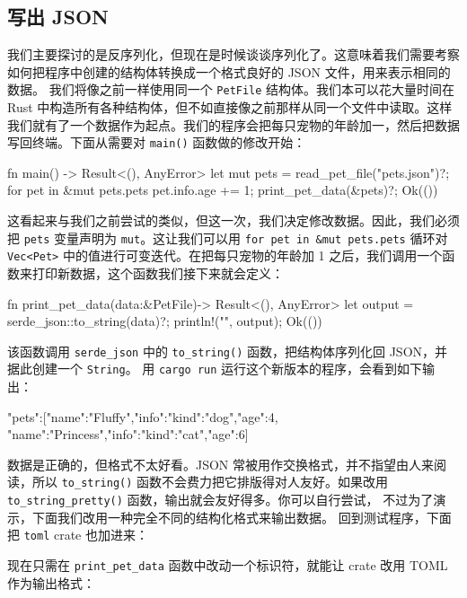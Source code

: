 \subsection{写出 JSON}
\label{idx:idx_d23393ce}
我们主要探讨的是反序列化，但现在是时候谈谈序列化了。这意味着我们需要考察如何把程序中创建的结构体转换成一个格式良好的 JSON 文件，用来表示相同的数据。
我们将像之前一样使用同一个 \texttt{PetFile} 结构体。我们本可以花大量时间在 Rust 中构造所有各种结构体，但不如直接像之前那样从同一个文件中读取。这样我们就有了一个数据作为起点。我们的程序会把每只宠物的年龄加一，然后把数据写回终端。下面从需要对 \texttt{main()} 函数做的修改开始：
\begin{codebox}[rust]
fn main() -> Result<(), AnyError> {
    let mut pets = read_pet_file("pets.json")?;
    for pet in &mut pets.pets {
        pet.info.age += 1;
    }
    print_pet_data(&pets)?;
    Ok(())
}
\end{codebox}
\label{idx:idx_812a2668}
这看起来与我们之前尝试的类似，但这一次，我们决定修改数据。因此，我们必须把 \texttt{pets} 变量声明为 \texttt{mut}。这让我们可以用 \texttt{for pet in \&\allowbreak{}mut pets.\allowbreak{}pets} 循环对 \texttt{Vec<Pet>} 中的值进行可变迭代。在把每只宠物的年龄加 1 之后，我们调用一个函数来打印新数据，这个函数我们接下来就会定义：
\begin{codebox}[rust]
fn print_pet_data(data:&PetFile)-> Result<(), AnyError> {
    let output = serde_json::to_string(data)?;
    println!("{}", output);
    Ok(())
}
\end{codebox}
该函数调用 \texttt{serde\_json} 中的 \texttt{to\_\allowbreak{}string(\allowbreak{})\allowbreak{}} 函数，把结构体序列化回 JSON，并据此创建一个 \texttt{String}。
用 \texttt{cargo run} 运行这个新版本的程序，会看到如下输出：
\begin{codeboxdark}
{"pets":[{"name":"Fluffy","info":{"kind":"dog","age":4}},
{"name":"Princess","info":{"kind":"cat","age":6}}]}
\end{codeboxdark}
数据是正确的，但格式不太好看。JSON 常被用作交换格式，并不指望由人来阅读，所以 \texttt{to\_\allowbreak{}string(\allowbreak{})\allowbreak{}} 函数不会费力把它排版得对人友好。如果改用
\texttt{to\_\allowbreak{}string\_\allowbreak{}pretty(\allowbreak{})\allowbreak{}} 函数，输出就会友好得多。你可以自行尝试，
不过为了演示，下面我们改用一种完全不同的结构化格式来输出数据。
回到测试程序，下面把 \texttt{toml} crate 也加进来：
现在只需在 \texttt{print\_\allowbreak{}pet\_\allowbreak{}data} 函数中改动一个标识符，就能让 crate 改用 TOML 作为输出格式：
